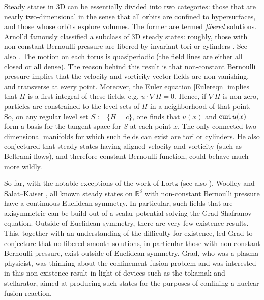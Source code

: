 \documentclass[11pt]{article}
\theoremstyle{plain}
\numberwithin{equation}{section}
\theoremstyle{remark}
\begin{document}
 
 Steady states in 3D can be essentially divided into two categories: those that are nearly two-dimensional in the sense that all orbits are confined to hypersurfaces, and those whose orbits explore volumes. The former are termed \emph{fibered} solutions.  Arnol'd famously classified a subclass of 3D steady states: roughly, those with non-constant Bernoulli pressure are fibered by invariant tori or cylinders \cite{A66, AK09}. See also \cite{S12}. The motion on each torus is quasiperiodic (the field lines are either all closed or all dense). The reason behind this result is that non-constant Bernoulli pressure implies that the velocity and vorticity vector fields are non-vanishing, and transverse at every point. Moreover, the Euler equation \eqref{Eulereqn} implies that $H$ is a first integral of these fields, e.g. $u\cdot \nabla H=0$. Hence, if $\nabla H$ is non-zero, particles are constrained to the level sets of $H$ in a neighborhood of that point. So, on any regular level set  $S:=\{H=c\}$, one finds that $u(x)$ and ${\rm curl} \ \! u(x)$ form a basis for the tangent space for $S$ at each point $x$. The only connected two-dimensional manifolds for which such fields can exist are tori or cylinders.  He  also conjectured that steady states having aligned velocity and vorticity (such as Beltrami flows), and therefore constant Bernoulli function, could behave much more wildly.  
 
 So far, with the notable exceptions of the work of Lortz \cite{L70} (see also \cite{J20}), Woolley \cite{W77} and Salat--Kaiser \cite{SK95,KS97}, all known steady states on $\mathbb{R}^3$ with non-constant Bernoulli pressure have a continuous Euclidean symmetry.  In particular, such fields that are axisymmetric can be build out of a scalar potential solving the  Grad-Shafranov equation.  Outside of Euclidean symmetry, there are very few existence results.  This, together with an understanding of the difficulty for existence, led Grad to conjecture that no fibered smooth solutions, in particular those with non-constant Bernoulli pressure,  exist outside of Euclidean symmetry.  Grad, who was a plasma physicist, was thinking about the confinement fusion problem and was interested in this non-existence result in light of devices such as the tokamak and stellarator, aimed at producing such states for the purposes of confining a nuclear fusion reaction.
 
\end{document}
